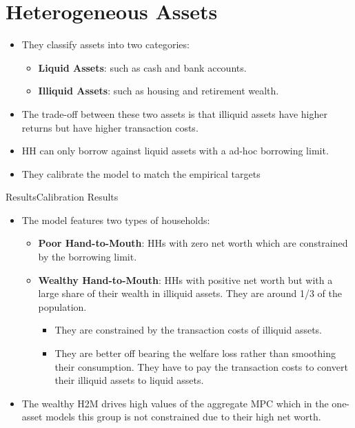 \documentclass{beamer}
\begin{document}
\section{Heterogeneous Assets}
\begin{frame}{\cite{kaplan2014model}}
\begin{itemize}
		\item They classify assets into two categories:
		\begin{itemize}
			\item \textbf{Liquid Assets}: such as cash and bank accounts.
			\item \textbf{Illiquid Assets}: such as housing and retirement wealth.
		\end{itemize}
		\item<2-> The trade-off between these two assets is that illiquid assets have higher returns but have higher transaction costs.
		\item<3->  HH can only borrow against liquid assets with a ad-hoc borrowing limit.
		\item<4->[] They calibrate the model to match the empirical targets
	\end{itemize}
\end{frame}
\begin{frame}{Results}{Calibration Results \citep{kaplan2014model}}
	\begin{itemize}
		\item The model features two types of households:
		\begin{itemize}
			\item<2-> \textbf{Poor Hand-to-Mouth}: HHs with zero net worth which are constrained by the borrowing limit. 
			\item<3-> \textbf{Wealthy Hand-to-Mouth}: HHs with positive net worth but with a large share of their wealth in illiquid assets. They are around 1/3 of the population.
			\begin{itemize}
				\item<4-> They are constrained by the transaction costs of illiquid assets.
				\item<4-> They are better off bearing the welfare loss rather than smoothing their consumption. They have to pay the transaction costs to convert their illiquid assets to liquid assets.
			\end{itemize}
		\end{itemize}
		\item<4-> The wealthy H2M drives high values of the aggregate MPC which in the one-asset models this group is not constrained due to their high net worth.
	\end{itemize}
\end{frame}
\end{document}
